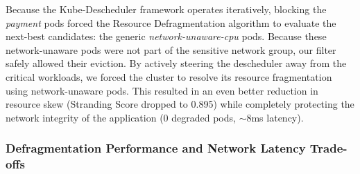 Because the Kube-Descheduler framework operates iteratively, blocking the \textit{payment} pods forced the Resource Defragmentation algorithm to evaluate the next-best candidates: the generic \textit{network-unaware-cpu} pods. Because these network-unaware pods were not part of the sensitive network group, our filter safely allowed their eviction. By actively steering the descheduler away from the critical workloads, we forced the cluster to resolve its resource fragmentation using network-unaware pods. This resulted in an even better reduction in resource skew (Stranding Score dropped to 0.895) while completely protecting the network integrity of the application (0 degraded pods, $\sim$8ms latency).

\subsubsection{Defragmentation Performance and Network Latency Trade-offs}
\label{subsubsec:netaware4_resultanalysis3_tradeoff}

